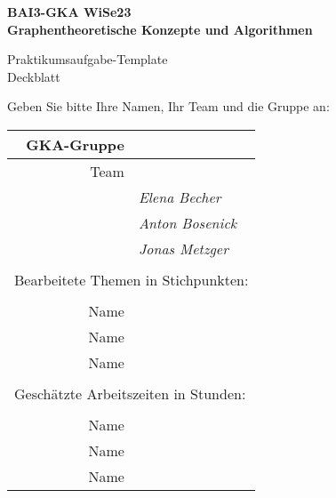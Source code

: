 

\thispagestyle{empty}
\begin{center}

    {\large {\bf   BAI3-GKA WiSe23 \\ Graphentheoretische Konzepte und Algorithmen \\[5mm]} }
    
{\huge Praktikumsaufgabe-Template  \\[5mm] Deckblatt}\\

\end{center}
Geben Sie bitte Ihre Namen, Ihr Team und die Gruppe  an:\\ 
				\begin{tabular}[t]{|r|l|}
				 \hline
				GKA-Gruppe&                 \raisebox{-3mm}{\rule[8mm]{100mm}{0mm} }\\ \hline    
				Team &                                                        \\ \hline			
				& \textit{ Elena Becher }               \\ \hline    
				& \textit{ Anton Bosenick }               \\ \hline			
				& \textit{ Jonas Metzger }             \\ \hline  			
				\multicolumn{2}{c}{}\\  			
				\multicolumn{2}{l}{Bearbeitete Themen in Stichpunkten:}\\			
				\multicolumn{2}{c}{}\\  \hline
				Name &                \\ \hline    
				Name&                  \\ \hline			
				Name&                \\ \hline 		
				\multicolumn{2}{c}{}\\  			
				\multicolumn{2}{l}{Geschätzte Arbeitszeiten in Stunden:}\\			
				\multicolumn{2}{c}{}\\  \hline
				Name&                 \\ \hline    
				Name&                  \\ \hline			
				Name&                \\ \hline 			
				\end{tabular}
~\\[4mm]
		
		
\vfill

